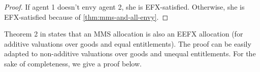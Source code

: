 \begin{proof}
If agent 1 doesn't envy agent 2, she is EFX-satisfied.
Otherwise, she is EFX-satisfied because of \cref{thm:mms-and-all-envy}.
\end{proof}

Theorem 2 in \citet{caragiannis2023new} states that an MMS allocation is also an EEFX allocation
(for additive valuations over goods and equal entitlements).
The proof can be easily adapted to non-additive valuations over goods and unequal entitlements.
For the sake of completeness, we give a proof below.

